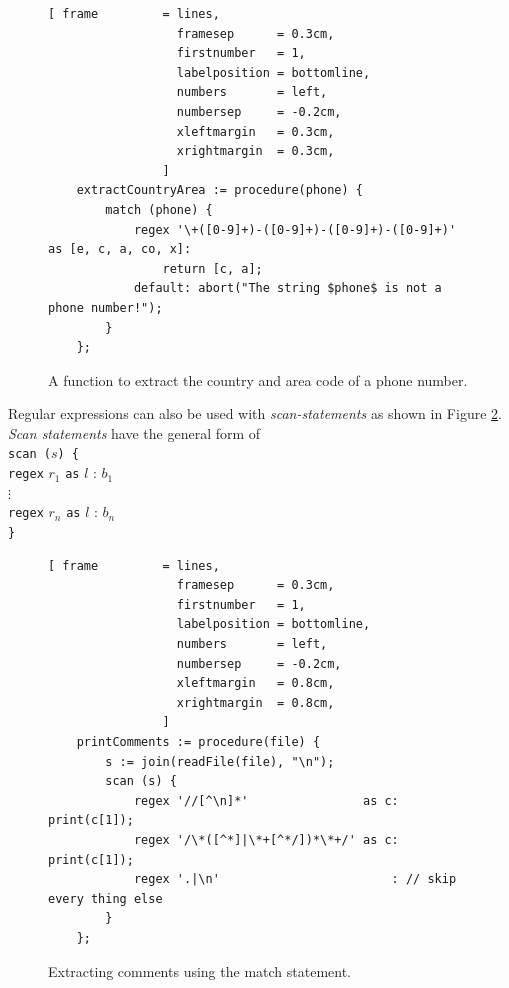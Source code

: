 \documentclass[11pt]{report}
\begin{document}
\begin{figure}[!ht]
\centering
\begin{Verbatim}[ frame         = lines, 
                  framesep      = 0.3cm, 
                  firstnumber   = 1,
                  labelposition = bottomline,
                  numbers       = left,
                  numbersep     = -0.2cm,
                  xleftmargin   = 0.3cm,
                  xrightmargin  = 0.3cm,
                ]
    extractCountryArea := procedure(phone) {
        match (phone) {
            regex '\+([0-9]+)-([0-9]+)-([0-9]+)-([0-9]+)' as [e, c, a, co, x]:
                return [c, a];
            default: abort("The string $phone$ is not a phone number!");
        }
    };
\end{Verbatim}
\vspace*{-0.3cm}
\caption{A function to extract the country and area code of a phone number.}
\label{fig:extract-phone-code.stlx}
\end{figure}
\pagebreak
Regular expressions can also be used with \textsl{scan-statements} as shown in Figure \ref{fig:find-comments-scan.stlx}. \textsl{Scan statements} have the general form of
\\[0.2cm]
\hspace*{1.3cm} \texttt{scan ($s$) \{}  \\
\hspace*{1.8cm} \texttt{regex} $r_1$ \texttt{as} $l$ : $b_1$ \\
\hspace*{1.8cm} $\vdots$                                                  \\
\hspace*{1.8cm} \texttt{regex} $r_n$ \texttt{as} $l$ : $b_n$ \\
\hspace*{1.3cm} \texttt{\}}             
\\[0.2cm]

\begin{figure}[!ht]
\centering
\begin{Verbatim}[ frame         = lines, 
                  framesep      = 0.3cm, 
                  firstnumber   = 1,
                  labelposition = bottomline,
                  numbers       = left,
                  numbersep     = -0.2cm,
                  xleftmargin   = 0.8cm,
                  xrightmargin  = 0.8cm,
                ]
    printComments := procedure(file) {
        s := join(readFile(file), "\n");
        scan (s) {
            regex '//[^\n]*'                as c: print(c[1]);
            regex '/\*([^*]|\*+[^*/])*\*+/' as c: print(c[1]);
            regex '.|\n'                        : // skip every thing else
        }
    };
\end{Verbatim}
\vspace*{-0.3cm}
\caption{Extracting comments using the match statement.}
\label{fig:find-comments-scan.stlx}
\end{figure}
\end{document}
